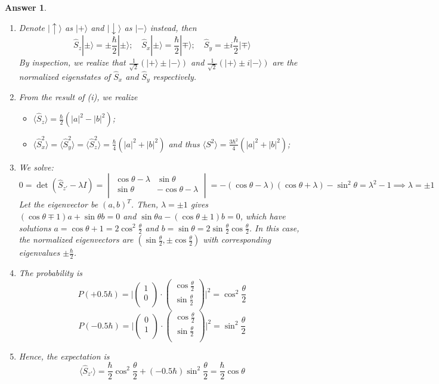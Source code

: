 \documentclass[a4paper]{article}
\newtheorem{ans}{Answer}[subsection]
\theoremstyle{new}
\begin{document}
\begin{ans}\leavevmode
\begin{enumerate}[label=(\roman*)]
\item Denote $|\uparrow\rangle$ as $|+\rangle$ and $|\downarrow\rangle$ as $|-\rangle$ instead, then
$$\hat{S}_z|\pm\rangle=\pm\frac{\hbar}{2}|\pm\rangle; \quad\hat{S}_x|\pm\rangle=\frac{\hbar}{2}|\mp\rangle;\quad\hat{S}_y=\pm i\frac{\hbar}{2}|\mp\rangle$$
By inspection, we realize that $\frac{1}{\sqrt{2}}(|+\rangle\pm|-\rangle)$ and $\frac{1}{\sqrt{2}}(|+\rangle\pm i|-\rangle)$ are the normalized eigenstates of $\hat{S}_x$ and $\hat{S}_y$ respectively.
\item From the result of (i), we realize
\begin{itemize}
    \item $\langle\hat{S}_z\rangle=\frac{\hbar}{2}(|a|^2-|b|^2)$;
    \item $\langle\hat{S}_x^2\rangle=\langle\hat{S}_y^2\rangle=\langle\hat{S}_z^2\rangle=\frac{\hbar}{4}(|a|^2+|b|^2)$ and thus $\langle S^2\rangle=\frac{3\hbar^2}{4}(|a|^2+|b|^2)$;
\end{itemize}
\item We solve:
$$0=\det(\hat{S}_{z'}-\lambda I)=\begin{vmatrix}\cos\theta-\lambda&\sin\theta\\\sin\theta&-\cos\theta-\lambda\\\end{vmatrix}=-(\cos\theta-\lambda)(\cos\theta+\lambda)-\sin^2\theta=\lambda^2-1\implies\lambda=\pm1$$
Let the eigenvector be $(a,b)^T$. Then, $\lambda=\pm1$ gives $(\cos\theta\mp1)a+\sin\theta b=0$ and $\sin\theta a-(\cos\theta\pm 1)b=0$, which have solutions $a=\cos\theta+1=2\cos^2\frac{\theta}{2}$ and $b=\sin\theta=2\sin\frac{\theta}{2}\cos\frac{\theta}{2}$. In this case, the normalized eigenvectors are $(\sin\frac{\theta}{2},\pm\cos\frac{\theta}{2})$ with corresponding eigenvalues $\pm\frac{\hbar}{2}$.
\item The probability is
$$P(+0.5\hbar)=\bigg|\begin{pmatrix}1\\0\\\end{pmatrix}\cdot\begin{pmatrix}\cos\frac{\theta}{2}\\\sin\frac{\theta}{2}\\\end{pmatrix}\bigg|^2=\cos^2\frac{\theta}{2}$$
$$P(-0.5\hbar)=\bigg|\begin{pmatrix}0\\1\\\end{pmatrix}\cdot\begin{pmatrix}\cos\frac{\theta}{2}\\\sin\frac{\theta}{2}\\\end{pmatrix}\bigg|^2=\sin^2\frac{\theta}{2}$$
\item Hence, the expectation is
$$\langle\hat{S}_{z'}\rangle=\frac{\hbar}{2}\cos^2\frac{\theta}{2}+(-0.5\hbar)\sin^2\frac{\theta}{2}=\frac{\hbar}{2}\cos\theta$$
\end{enumerate}
\end{ans}
\newpage
\end{document}
